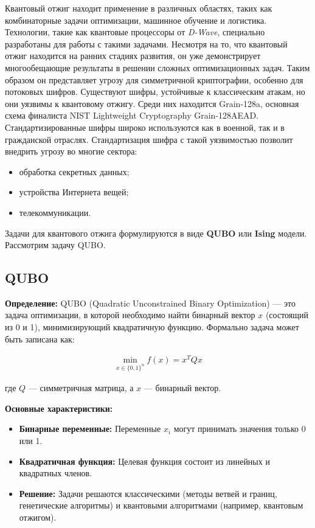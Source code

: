 \documentclass[12pt]{article}
\begin{document}
Квантовый отжиг находит применение в различных областях, таких как комбинаторные задачи оптимизации, машинное обучение и логистика. Технологии, такие как квантовые процессоры от \textit{D-Wave}, специально разработаны для работы с такими задачами. Несмотря на то, что квантовый отжиг находится на ранних стадиях развития, он уже демонстрирует многообещающие результаты в решении сложных оптимизационных задач. Таким образом он представляет угрозу для симметричной криптографии, особенно для потоковых шифров. Существуют шифры, устойчивые к классическим атакам, но они уязвимы к квантовому отжигу. Среди них находится Grain-128a, основная схема финалиста NIST Lightweight Cryptography Grain-128AEAD. Стандартизированные шифры широко используются как в военной, так и в гражданской отраслях. Стандартизация шифра с такой уязвимостью позволит внедрить угрозу во многие сектора:

\begin{itemize}[label=--]
    \item обработка секретных данных;
    \item устройства Интернета вещей;
    \item телекоммуникации.
\end{itemize}

Задачи для квантового отжига формулируются в виде \textbf{QUBO} или \textbf{Ising} модели. Рассмотрим задачу QUBO. 

\subsection{QUBO}

\textbf{Определение:} QUBO (Quadratic Unconstrained Binary Optimization) — это задача оптимизации, в которой необходимо найти бинарный вектор \( x \) (состоящий из 0 и 1), минимизирующий квадратичную функцию. Формально задача может быть записана как:

\begin{align*}
\min_{x \in \{0, 1\}^n} f(x) = x^T Q x 
\end{align*}

где \( Q \) — симметричная матрица, а \( x \) — бинарный вектор.

\textbf{Основные характеристики:}
\begin{itemize}
    \item \textbf{Бинарные переменные:} Переменные \( x_i \) могут принимать значения только 0 или 1.
    \item \textbf{Квадратичная функция:} Целевая функция состоит из линейных и квадратных членов.
    \item \textbf{Решение:} Задачи решаются классическими (методы ветвей и границ, генетические алгоритмы) и квантовыми алгоритмами (например, квантовым отжигом).
\end{itemize}
\end{document}
